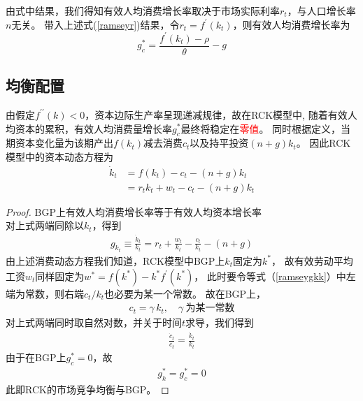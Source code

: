 \documentclass[cn,normal,11pt,black]{elegantnote}
\begin{document}
        由式中结果，我们得知有效人均消费增长率取决于市场实际利率$r_t$，与人口增长率$n$无关。
        带入上述式(\ref{ramseyr})结果，令$r_t=f^\prime(k_t)$，则有效人均消费增长率为
            \begin{equation}
                g_c^*  = \frac{f^\prime(k_t) - \rho}{\theta} - g
            \end{equation}

\subsection{均衡配置} 

    由假定$f^{\prime \prime}(k) < 0$，资本边际生产率呈现递减规律，故在RCK模型中,
    随着有效人均资本的累积，有效人均消费量增长率$g_c^*$最终将稳定在\textcolor{red}{零值}。
    同时根据定义，当期资本变化量为该期产出$f(k_t)$减去消费$c_t$以及持平投资$(n+g)k_t$。
    因此RCK模型中的资本动态方程为
    \begin{align}  \label{ramseygky}
        \dot{k}_t & = f(k_t) - c_t - (n+g)k_t \\ 
                & = r_tk_t + w_t - c_t - (n+g)k_t 
    \end{align}

    \begin{proof}{BGP上有效人均消费增长率等于有效人均资本增长率}
    \mbox{} \\
    对上式两端同除以$k_t$，得到
    \begin{align}
        g_{k_t} \equiv \frac{\dot{k}_t}{k_t} = r_t + \frac{w_t}{k_t} - \frac{c_t}{k_t} - (n+g)     \label{ramseygkk}
    \end{align}
    由上述消费动态方程我们知道，RCK模型中BGP上$k_t$固定为$k^*$，
    故有效劳动平均工资$w_t$同样固定为$w^* = f(k^*) - k^* f^\prime(k^*)$，
    此时要令等式（\ref{ramseygkk}）中左端为常数，则右端$c_t/k_t$也必要为某一个常数。
    故在BGP上，
    \begin{align}
        c_t = \gamma \, k_t, \quad \gamma \ \mbox{为某一常数}
    \end{align}
    对上式两端同时取自然对数，并关于时间$t$求导，我们得到
    \begin{align}
        \frac{\dot{c}_t}{c_t} = \frac{\dot{k}_t}{k_t}
    \end{align}
    由于在BGP上$g_{c}^*=0$，故
    \begin{align}
        g^*_k = g^*_c =0
    \end{align}
    此即RCK的市场竞争均衡与BGP。
    \end{proof}
\end{document}
